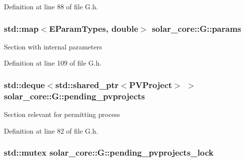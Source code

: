 Definition at line 88 of file G.\+h.

\hypertarget{classsolar__core_1_1_g_a045f1db40b15301ed5ec8aefb5327b0e}{}
\subsubsection[{params}]{\setlength{\rightskip}{0pt plus 5cm}std\+::map$<${\bf E\+Param\+Types}, double$>$ solar\+\_\+core\+::\+G\+::params\hspace{0.3cm}{\ttfamily [protected]}}\label{classsolar__core_1_1_g_a045f1db40b15301ed5ec8aefb5327b0e}
Section with internal parameters 

Definition at line 109 of file G.\+h.

\hypertarget{classsolar__core_1_1_g_a3a87f9e5c14cd5bae4be8a4da538181e}{}
\subsubsection[{pending\+\_\+pvprojects}]{\setlength{\rightskip}{0pt plus 5cm}std\+::deque$<$std\+::shared\+\_\+ptr$<${\bf P\+V\+Project}$>$ $>$ solar\+\_\+core\+::\+G\+::pending\+\_\+pvprojects\hspace{0.3cm}{\ttfamily [protected]}}\label{classsolar__core_1_1_g_a3a87f9e5c14cd5bae4be8a4da538181e}
Section relevant for permitting process 

Definition at line 82 of file G.\+h.

\hypertarget{classsolar__core_1_1_g_a7ae124e062dbd50b0da66f34c9633965}{}
\subsubsection[{pending\+\_\+pvprojects\+\_\+lock}]{\setlength{\rightskip}{0pt plus 5cm}std\+::mutex solar\+\_\+core\+::\+G\+::pending\+\_\+pvprojects\+\_\+lock\hspace{0.3cm}{\ttfamily [protected]}}\label{classsolar__core_1_1_g_a7ae124e062dbd50b0da66f34c9633965}


